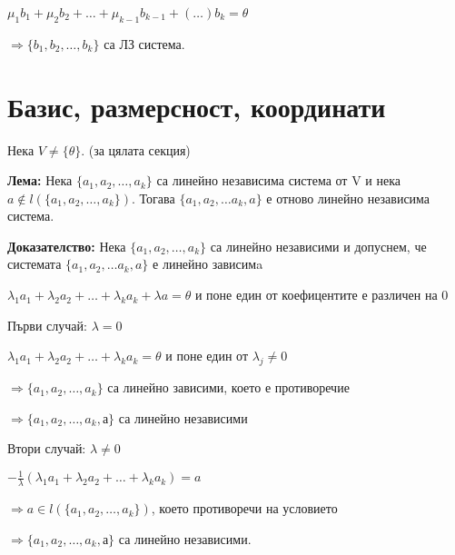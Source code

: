 \documentclass[fleqn,12pt]{article}
\begin{document}
\begin{flushleft}
$ \mu_1 b_1 + \mu_2 b_2 + \dots + \mu_{k-1} b_{k-1} + (\dots) b_k = \theta $

$ \Rightarrow \{ b_1, b_2, \dots, b_k \} $ са ЛЗ система. \square


\section{Базис, размерсност, координати}
    Нека $ V \neq \{ \theta \} $. (за цялата секция)
    
    \vspace{5mm}
    
    \textbf{Лема:} Нека $\{a_1, a_2, \dots, a_k\}$ са линейно независима система от V и нека $ a \notin l(\{ a_1, a_2, \dots, a_k\}) $. Тогава $ \{a_1, a_2, \dots a_k, a \} $ е отново линейно независима система.

    \vspace{5mm}
    
    \textbf{Доказателство:} Нека $\{a_1, a_2, \dots, a_k\} $ са линейно независими и допуснем, че системата $ \{a_1, a_2, \dots a_k, a \} $ е линейно зависимa

    \vspace{5mm}
    
    $ \lambda_1 a_1 + \lambda_2 a_2 + \dots + \lambda_k a_k + \lambda a = \theta $ и поне един от коефицентите е различен на 0

    \vspace{5mm}
    
    Първи случай: $\lambda = 0 $

    $ \lambda_1 a_1 + \lambda_2 a_2 + \dots + \lambda_k a_k = \theta $ и поне един от $\lambda_j \neq 0 $

    $ \Rightarrow \{a_1, a_2, \dots, a_k\} $ са линейно зависими, което е противоречие
    
    $ \Rightarrow \{a_1, a_2, \dots, a_k, а\} $ са линейно независими

    \vspace{5mm}
    
    Втори случай: $\lambda \neq 0 $

    $ - \frac{1}{\lambda} ( \lambda_1 a_1 + \lambda_2 a_2 + \dots + \lambda_k a_k ) = a $ 

    $ \Rightarrow a \in l(\{a_1, a_2, \dots, a_k\}) $, което противоречи на условието
    
    $ \Rightarrow \{a_1, a_2, \dots, a_k, а\} $ са линейно независими. \square

    
    \vspace{5mm}
    

\end{flushleft}
\end{document}

